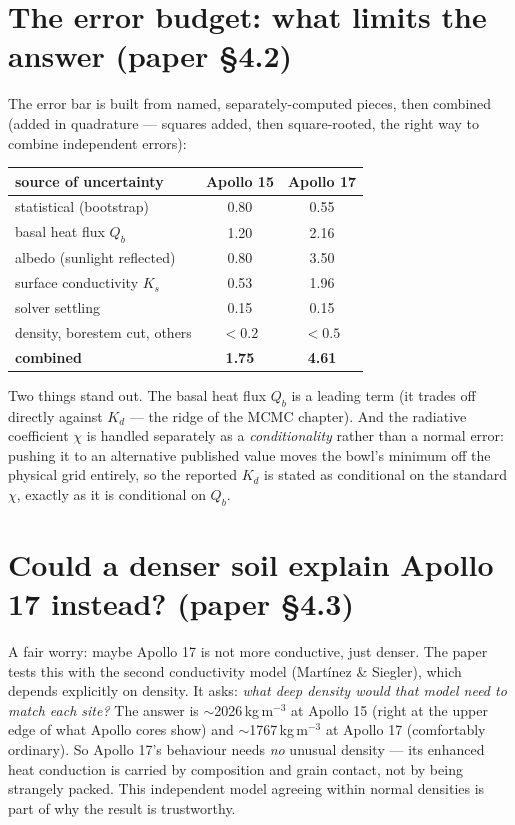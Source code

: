 \documentclass[11pt]{article}
\begin{document}
\section{The error budget: what limits the answer (paper \S4.2)}
The error bar is built from named, separately-computed pieces, then
combined (added in quadrature --- squares added, then square-rooted,
the right way to combine independent errors):
\begin{center}\small
\renewcommand{\arraystretch}{1.15}
\begin{tabular}{lcc}
\toprule
source of uncertainty & Apollo 15 & Apollo 17 \\
\midrule
statistical (bootstrap)        & 0.80 & 0.55 \\
basal heat flux $Q_b$          & 1.20 & 2.16 \\
albedo (sunlight reflected)    & 0.80 & 3.50 \\
surface conductivity $K_s$     & 0.53 & 1.96 \\
solver settling                & 0.15 & 0.15 \\
density, borestem cut, others  & $<0.2$ & $<0.5$ \\
\midrule
\textbf{combined} & \textbf{1.75} & \textbf{4.61} \\
\bottomrule
\end{tabular}
\end{center}
Two things stand out. The basal heat flux $Q_b$ is a leading term (it
trades off directly against $K_d$ --- the ridge of the MCMC chapter). And
the radiative coefficient $\chi$ is handled separately as a
\emph{conditionality} rather than a normal error: pushing it to an
alternative published value moves the bowl's minimum off the physical
grid entirely, so the reported $K_d$ is stated as conditional on the
standard $\chi$, exactly as it is conditional on $Q_b$.

\section{Could a denser soil explain Apollo 17 instead? (paper \S4.3)}
A fair worry: maybe Apollo 17 is not more conductive, just denser. The
paper tests this with the second conductivity model (Martínez \& Siegler),
which depends explicitly on density. It asks: \emph{what deep density
would that model need to match each site?} The answer is
$\sim$2026\,kg\,m$^{-3}$ at Apollo 15 (right at the upper edge of what
Apollo cores show) and $\sim$1767\,kg\,m$^{-3}$ at Apollo 17 (comfortably
ordinary). So Apollo 17's behaviour needs \emph{no} unusual density ---
its enhanced heat conduction is carried by composition and grain contact,
not by being strangely packed. This independent model agreeing within
normal densities is part of why the result is trustworthy.
\end{document}
